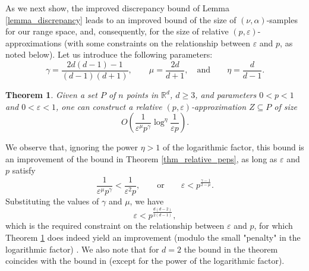 \documentclass[11pt]{article}
\newtheorem{theorem}{Theorem}[section]
\def\reals{\mathbb R}
\def\peps{(p,\varepsilon)}
\def\eps{\varepsilon}
\begin{document}
As we next show, the improved discrepancy bound of Lemma \ref{lemma_discrepancy} leads to an improved bound of the size of $(\nu,\alpha)$-samples for our range space, and, consequently, for the size of relative $\peps$-approximations (with some constraints on the relationship between $\eps$ and $p$, as noted below). Let us introduce the following parameters:
$$
\gamma = \frac{2d(d-1)-1}{(d-1)(d+1)}, \quad \quad \mu = \frac{2d}{d+1}, \quad \text{and} \quad \quad \eta = \frac{d}{d-1}.
$$

\begin{theorem} \label{thm_improved_relative_peps}
Given a set $P$ of $n$ points in $\reals^{d}$, $d \geq 3$, and parameters $0 < p < 1$ and $0 < \eps < 1$, one can construct a relative $(p,\eps)$-approximation $Z \subseteq P$ of size
$$
O\left(\frac{1}{\eps^{\mu} p^{\gamma}} \log^{\eta} \frac{1}{\eps p}\right).
$$
\end{theorem}

We observe that, ignoring the power $\eta > 1$ of the logarithmic factor, this bound is an improvement of the bound in Theorem \ref{thm_relative_peps}, as long as $\eps$ and $p$ satisfy
$$
\frac{1}{\eps^{\mu}p^{\gamma}} < \frac{1}{\eps^{2}p}, \quad\quad \text{or} \quad\quad \eps < p^{\frac{\gamma-1}{2-\mu}}.
$$
Substituting the values of $\gamma$ and $\mu$, we have
$$
\eps < p^{\frac{d(d-2)}{2(d-1)}},
$$
which is the required constraint on the relationship between $\eps$ and $p$, for which Theorem \ref{thm_improved_relative_peps} does indeed yield an improvement (modulo the small "penalty" in the logarithmic factor) . We also note that for $d = 2$ the bound in the theorem coincides with the bound in \cite{hs11} (except for the power of the logarithmic factor).
\end{document}
